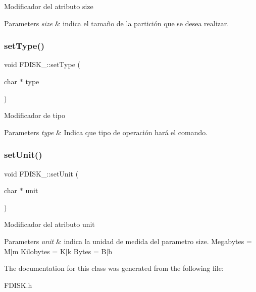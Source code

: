 Modificador del atributo size 
\begin{DoxyParams}{Parameters}
{\em size} & indica el tamaño de la partición que se desea realizar. \\
\hline
\end{DoxyParams}
\mbox{\label{classFDISK___aa45b16384c955ecb2c7f0a02f8e62bb0}} 
\subsubsection{\texorpdfstring{set\+Type()}{setType()}}
{\footnotesize\ttfamily void F\+D\+I\+S\+K\+\_\+\+::set\+Type (\begin{DoxyParamCaption}\item[{char $\ast$}]{type }\end{DoxyParamCaption})\hspace{0.3cm}{\ttfamily [inline]}}

Modificador de tipo 
\begin{DoxyParams}{Parameters}
{\em type} & Indica que tipo de operación hará el comando. \\
\hline
\end{DoxyParams}
\mbox{\label{classFDISK___ac829852f41210c96957753e611c96c32}} 
\subsubsection{\texorpdfstring{set\+Unit()}{setUnit()}}
{\footnotesize\ttfamily void F\+D\+I\+S\+K\+\_\+\+::set\+Unit (\begin{DoxyParamCaption}\item[{char $\ast$}]{unit }\end{DoxyParamCaption})\hspace{0.3cm}{\ttfamily [inline]}}

Modificador del atributo unit 
\begin{DoxyParams}{Parameters}
{\em unit} & indica la unidad de medida del parametro size. Megabytes = M$\vert$m Kilobytes = K$\vert$k Bytes = B$\vert$b \\
\hline
\end{DoxyParams}


The documentation for this class was generated from the following file\+:\begin{DoxyCompactItemize}
\item 
F\+D\+I\+S\+K.\+h\end{DoxyCompactItemize}
